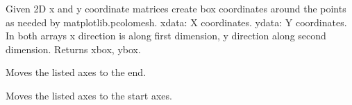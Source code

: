 \documentclass[letterpaper,10pt,english]{sphinxmanual}
\begin{document}

\begin{fulllineitems}
\label{\detokenize{tools:flap.tools.grid_to_box}}
Given 2D x and y coordinate matrices create box coordinates around the points as
needed by matplotlib.pcolomesh.
xdata: X coordinates.
ydata: Y coordinates.
In both arrays x direction is along first dimension, y direction along second dimension.
Returns xbox, ybox.

\end{fulllineitems}


\begin{fulllineitems}
\label{\detokenize{tools:flap.tools.move_axes_to_end}}
Moves the listed axes to the end.

\end{fulllineitems}


\begin{fulllineitems}
\label{\detokenize{tools:flap.tools.move_axes_to_start}}
Moves the listed axes to the start axes.

\end{fulllineitems}

\end{document}
